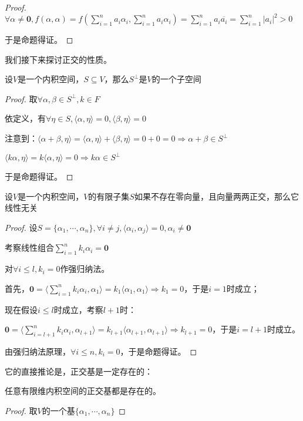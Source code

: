 \documentclass[12pt, a4paper, oneside, UTF8]{ctexbook}
\begin{document}
\begin{para}{0}
\begin{proof}
						$\forall \alpha \neq \mathbf{0},f(\alpha ,\alpha )=f(\sum\limits_{i=1}^{n} a_i \alpha_i,\sum\limits_{i=1}^{n} a_i \alpha_i )=\sum\limits_{i=1}^{n} a_i \overline{a_i} = \sum\limits_{i=1}^{n} |a_i|^2 > 0$

						于是命题得证。
					\end{proof}
					我们接下来探讨正交的性质。
				\point{}
					\begin{proposition}
						设$V$是一个内积空间，$S \subseteq V$，那么$S^{\perp}$是$V$的一个子空间
					\end{proposition}
					\begin{proof}
						取$\forall \alpha ,\beta \in S^{\perp},k\in F$

						依定义，有$\forall \eta \in S,\langle \alpha ,\eta \rangle=0,\langle \beta ,\eta \rangle=0$

						注意到：$\langle \alpha +\beta ,\eta \rangle=\langle \alpha ,\eta \rangle+\langle \beta ,\eta \rangle=0+0=0 \Rightarrow \alpha +\beta \in S^{\perp}$

						$\langle k\alpha ,\eta \rangle=k\langle \alpha ,\eta \rangle=0 \Rightarrow k\alpha \in S^{\perp}$

						于是命题得证。
					\end{proof}
				\point{}
					\begin{proposition}
						设$V$是一个内积空间，$V$的有限子集$S$如果不存在零向量，且向量两两正交，那么它线性无关
					\end{proposition}
					\begin{proof}
						设$S=\{\alpha_1,\cdots,\alpha_n\},\forall i \neq j,\langle \alpha_i,\alpha_j \rangle=0,\alpha_i \neq \mathbf{0}$

						考察线性组合$\sum\limits_{i=1}^{n} k_i \alpha_i = \mathbf{0}$

						对$\forall i \leqslant l,k_i = 0$作强归纳法。

						首先，$\mathbf{0}=\langle \sum\limits_{i=1}^{n} k_i \alpha_i,\alpha_1\rangle = k_1 \langle \alpha_1,\alpha_1 \rangle \Rightarrow k_1=0$，于是$i=1$时成立；

						现在假设$i \leqslant l$时成立，考察$l+1$时：

						$\mathbf{0}=\langle \sum\limits_{i=l+1}^{n} k_i \alpha_i,\alpha_{l+1}\rangle = k_{l+1} \langle \alpha_{l+1},\alpha_{l+1} \rangle \Rightarrow k_{l+1}=0$，于是$i=l+1$时成立。

						由强归纳法原理，$\forall i \leqslant n,k_i=0$，于是命题得证。
					\end{proof}
					它的直接推论是，正交基是一定存在的：
				\point{}
					\begin{proposition}
						任意有限维内积空间的正交基都是存在的。
					\end{proposition}
					\begin{proof}
						取$V$的一个基$\{\alpha_1,\cdots,\alpha_n\}$


\end{proof}
\end{para}
\end{document}
